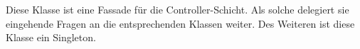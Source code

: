Diese Klasse ist eine Fassade für die Controller-Schicht.
Als solche delegiert sie eingehende Fragen an die entsprechenden Klassen weiter.
Des Weiteren ist diese Klasse ein Singleton.